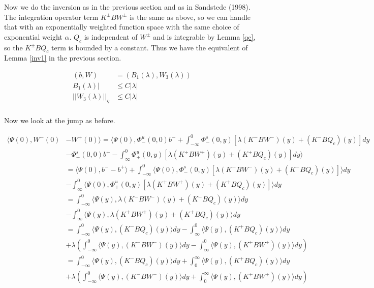 \documentclass[12pt]{article}
\begin{document}
Now we do the inversion as in the previous section and as in Sandstede (1998). The integration operator term $K^\pm B W^\pm$ is the same as above, so we can handle that with an exponentially weighted function space with the same choice of exponential weight $\alpha$. $Q_c$ is independent of $W^\pm$ and is integrable by Lemma \ref{qc}, so the $K^\pm B Q_c$ term is bounded by a constant. Thus we have the equivalent of Lemma \ref{inv1} in the previous section.

\begin{align*}
(b, W) &= (B_1(\lambda), W_3(\lambda))\\
B_1(\lambda)| &\leq C|\lambda|\\
||W_3(\lambda)||_\eta &\leq C|\lambda|\\
\end{align*}

Now we look at the jump as before. 

\begin{align*}
\langle \Psi(0), W^-(0) &- W^+(0) \rangle = \langle \Psi(0), \Phi^u_-(0, 0)b^- + \int_{-\infty}^0 \Phi^s_-(0, y)[\lambda (K^- B W^-)(y) + (K^- B Q_c)(y)] dy  \\
&- \Phi^s_+(0, 0)b^+ - \int_\infty^0 \Phi^u_+(0, y)[\lambda (K^+ B W^+)(y) + (K^+ B Q_c)(y) ] dy \rangle \\
&= \langle \Psi(0), b^- - b^+\rangle + \int_{-\infty}^0 \langle \Psi(0), \Phi^s_-(0, y)[\lambda (K^- B W^-)(y) + (K^- B Q_c)(y) ] \rangle dy  \\
&- \int_\infty^0 \langle \Psi(0), \Phi^u_+(0, y)[\lambda (K^+ B W^+)(y) + (K^+ B Q_c)(y) ] \rangle dy  \\
&= \int_{-\infty}^0 \langle \Psi(y), \lambda (K^- B W^-)(y) + (K^- B Q_c)(y) \rangle dy \\
&- \int_\infty^0 \langle \Psi(y), \lambda (K^+ B W^+)(y) + (K^+ B Q_c)(y) \rangle dy \\
&= \int_{-\infty}^0 \langle \Psi(y), (K^- B Q_c)(y) \rangle dy - \int_{\infty}^0 \langle \Psi(y), (K^+ B Q_c)(y) \rangle dy  \\
&+ \lambda\left( \int_{-\infty}^0 \langle \Psi(y), (K^- B W^-)(y) \rangle dy - \int_\infty^0 \langle \Psi(y), (K^+ B W^+)(y) \rangle dy \right) \\
&= \int_{-\infty}^0 \langle \Psi(y), (K^- B Q_c)(y) \rangle dy + \int_0^{\infty} \langle \Psi(y), (K^+ B Q_c)(y) \rangle dy  \\
&+ \lambda\left( \int_{-\infty}^0 \langle \Psi(y), (K^- B W^-)(y) \rangle dy + \int_0^\infty \langle \Psi(y), (K^+ B W^+)(y) \rangle dy \right) \\
\end{align*}
\end{document}
